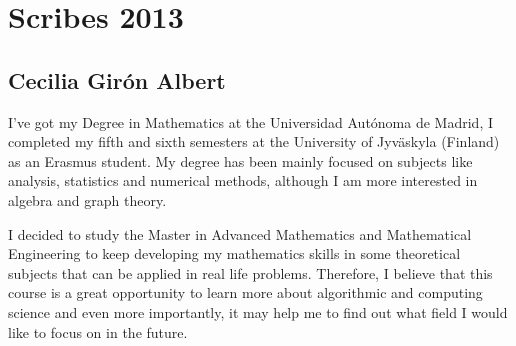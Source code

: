 \chapter*{Scribes 2013}

\section{Cecilia Girón Albert}

I've got my Degree in Mathematics at the Universidad Autónoma de Madrid, I completed my fifth and sixth semesters at the University of Jyväskyla (Finland) as an Erasmus student. My degree has been mainly focused on subjects like analysis, statistics and numerical methods, although I am more interested in algebra and graph theory. 

I decided to study the Master in Advanced Mathematics and Mathematical Engineering to keep developing my mathematics skills in some theoretical subjects that can be applied in real life problems. Therefore, I believe that this course is a great opportunity to learn more about algorithmic and computing science and even more importantly, it may help me to find out what field I would like to focus on in the future.


